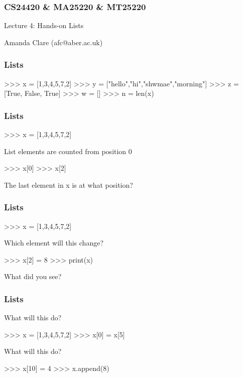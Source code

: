 \documentclass{beamer}
\begin{document}

\begin{frame}
\frametitle{CS24420 \& MA25220 \& MT25220}

\begin{center}
\begin{huge}
Lecture 4: Hands-on Lists 
\end{huge}
\bigskip

Amanda Clare (afc@aber.ac.uk)

\end{center}
\end{frame}


\begin{frame}[fragile]
\frametitle{Lists}
\begin{code}
>>> x = [1,3,4,5,7,2]
>>> y = ["hello","hi","shwmae","morning"]
>>> z = [True, False, True]
>>> w = []
>>> n = len(x)
\end{code}
\end{frame}




\begin{frame}[fragile]
\frametitle{Lists}
\begin{code}
>>> x = [1,3,4,5,7,2]
\end{code}
 List elements are counted from position 0
\begin{code}
>>> x[0]
>>> x[2]
\end{code}
The last element in x is at what position?
\end{frame}

\begin{frame}[fragile]
\frametitle{Lists}
\begin{code}
>>> x = [1,3,4,5,7,2]
\end{code}
Which element will this change?
\begin{code}
>>> x[2] = 8
>>> print(x)
\end{code}
What did you see?
\end{frame}

\begin{frame}[fragile]
\frametitle{Lists}
What will this do?
\begin{code}
>>> x = [1,3,4,5,7,2]
>>> x[0] = x[5]
\end{code}
\bigskip
What will this do?
\begin{code}
>>> x[10] = 4
>>> x.append(8)
\end{code}
\end{frame}
\end{document}
